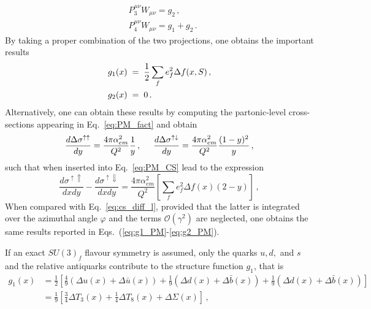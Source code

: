 \begin{align}
  &P_3^{\mu \nu} W_{\mu \nu} = g_2\,, \\
  &P_4^{\mu \nu} W_{\mu \nu} = g_1 + g_2 \,.
\end{align}
By taking a proper combination of the two projections, one obtains the important results
\begin{align}
  &g_1(x) \hspace{1mm} = \hspace{1mm} \frac{1}{2} \sum_{f} e_f^2 \Delta f (x, S) \,,
  \label{eq:g1_PM}\\
  &g_2 (x) \hspace{1mm} = \hspace{1mm} 0\,.
  \label{eq:g2_PM}
\end{align}
Alternatively, one can obtain these results by computing the partonic-level cross-sections appearing in Eq.~\eqref{eq:PM_fact} and obtain
\begin{equation}
  \frac{d \Delta \sigma^{\uparrow \uparrow}}{dy} = \frac{4 \pi \alpha_{em}^2}{Q^2} \frac{1}{y} \,, \hspace{5mm} \frac{d \Delta \sigma^{\uparrow \downarrow}}{dy} = \frac{4 \pi \alpha_{em}^2}{Q^2} \frac{(1-y)^2}{y}\,,
\end{equation}
such that when inserted into Eq.~\eqref{eq:PM_CS} lead to the expression
\begin{equation}
  \frac{d \sigma^{\uparrow \Uparrow}}{dx dy} - \frac{d \sigma^{\uparrow \Downarrow}}{dx dy} = \frac{4 \pi \alpha_{em}^2}{Q^2} \left[ \sum_{f} e_f^2 \Delta f(x) (2-y)\right] \,,
\end{equation}
When compared with Eq.~\eqref{eq:cs_diff_l}, provided that the latter is integrated over the azimuthal angle $\varphi$ and the terms $\mathcal{O}(\gamma^2)$ are neglected, one obtains the same results reported in Eqs.~(\ref{eq:g1_PM}-\ref{eq:g2_PM}).\par
If an exact $SU(3)_f$ flavour symmetry is assumed, only the quarks $u,d,$ and $s$ and the relative antiquarks contribute to the structure function $g_1$, that is
\begin{equation}
  \begin{split}
    g_1(x) & = \frac{1}{2} \left[ \frac{4}{9} \left( \Delta u(x) + \Delta \bar{u}(x) \right) + \frac{1}{9} \left(  \Delta d (x) + \Delta \bar{b}(x)  \right) + \frac{1}{9}\left(  \Delta d (x) + \Delta \bar{b}(x)  \right) \right] \\
    & = \frac{1}{9} \left[ \frac{3}{4} \Delta T_3 (x) + \frac{1}{4} \Delta T_8 (x) + \Delta \Sigma (x)  \right] \,,
  \end{split}
  \label{eq:g1_NPM_ev}
\end{equation}
